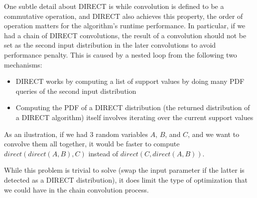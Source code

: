 One subtle detail about DIRECT is while convolution is defined to be a commutative operation, and 
DIRECT also achieves this property, the order of operation matters for the algorithm's runtime 
performance.
In particular, if we had a chain of DIRECT convolutions, the result of a convolution should not be set 
as the second input distribution in the later convolutions to avoid performance penalty.
This is caused by a nested loop from the following two mechanisms:
\begin{itemize}
    \item DIRECT works by computing a list of support values by doing many PDF queries of the second input
        distribution
    \item Computing the PDF of a DIRECT distribution (the returned distribution of a DIRECT 
        algorithm) itself involves iterating over the current support values
\end{itemize}

As an ilustration, if we had 3 random variables $A$, $B$, and  $C$, and we want 
to convolve them all together, it would be faster to compute $direct(direct(A, B), C)$ instead of 
$direct(C, direct(A, B))$.

While this problem is trivial to solve (swap the input parameter if the latter is detected as a 
DIRECT distribution), it does limit the type of optimization that we could have in the chain convolution 
process.
